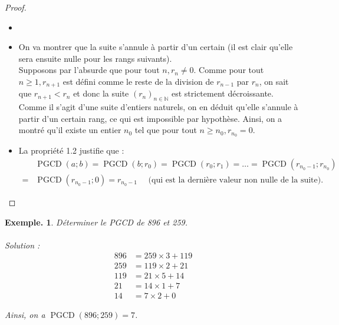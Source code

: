 \documentclass[12pt]{article}
\theoremstyle{break}
\newtheorem*{example}{Exemple.}
\begin{document}
\begin{proof}
\begin{itemize}[noitemsep,topsep=0pt]
  \item[]
  \item On va montrer que la suite s'annule à partir d'un certain (il est clair qu'elle sera ensuite nulle pour les rangs suivants).\\
Supposons par l'absurde que pour tout $n, r_{n} \neq 0$. Comme pour tout $n \geqslant 1, r_{n+1}$ est défini comme le reste de la division de $r_{n-1}$ par $r_{n}$, on sait que $r_{n+1}<r_{n}$ et donc la suite $\left(r_{n}\right)_{n \in \mathbb{N}}$ est strictement décroissante. Comme il s'agit d'une suite d'entiers naturels, on en déduit qu'elle s'annule à partir d'un certain rang, ce qui est impossible par hypothèse. Ainsi, on a montré qu'il existe un entier $n_{0}$ tel que pour tout $n \geqslant n_{0}, r_{n_{0}}=0$.
  \item La propriété 1.2 justifie que :
  $$
  \begin{aligned}
  & \operatorname{PGCD}(a ; b)=\operatorname{PGCD}\left(b ; r_{0}\right)=\operatorname{PGCD}\left(r_{0} ; r_{1}\right)=\ldots=\operatorname{PGCD}\left(r_{n_{0}-1} ; r_{n_{0}}\right) \\
  = & \operatorname{PGCD}\left(r_{n_{0}-1} ; 0\right)=r_{n_{0}-1} \quad \text { (qui est la dernière valeur non nulle de la suite). }
  \end{aligned}
  $$
\end{itemize}
\end{proof}
\vspace{-2em}
\begin{example}
Déterminer le PGCD de 896 et 259.\\
~\\Solution :\\

$$
\begin{aligned}
896 & =259 \times 3+119 \\
259 & =119 \times 2+21 \\
119 & =21 \times 5+14 \\
21 & =14 \times 1+7 \\
14 & =7 \times 2+0
\end{aligned}
$$

Ainsi, on a $\operatorname{PGCD}(896 ; 259)=7$.
\end{example}
\end{document}
